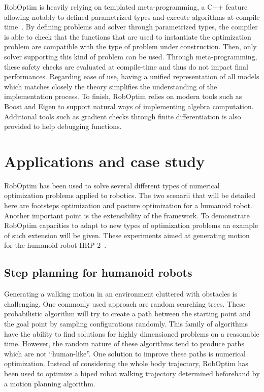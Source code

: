 \documentclass[conference,final,a4paper,twocolumn,9pt]{IEEEtran}
\begin{document}
RobOptim is heavily relying on templated meta-programming, a C++
feature allowing notably to defined parametrized types and execute
algorithms at compile time~\cite{iso14882}. By defining problems and
solver through parametrized types, the compiler is able to check that
the functions that are used to instantiate the optimization problem
are compatible with the type of problem under construction. Then, only
solver supporting this kind of problem can be used. Through
meta-programming, these safety checks are evaluated at compile-time
and thus do not impact final performances. Regarding ease of use,
having a unified representation of all models which matches closely
the theory simplifies the understanding of the implementation process.
To finish, RobOptim relies on modern tools such as Boost and Eigen to
support natural ways of implementing algebra computation. Additional
tools such as gradient checks through finite differentiation is also
provided to help debugging functions.


\section{Applications and case study}\label{sec:application}


RobOptim has been used to solve several different types of numerical
optimization problems applied to robotics. The two scenarii that will
be detailed here are footsteps optimization and posture optimization
for a humanoid robot. Another important point is the extensibility of
the framework. To demonstrate RobOptim capacities to adapt to new
types of optimization problems an example of such extension will be
given. These experiments aimed at generating motion for the humanoid
robot HRP-2~\cite{hrp2}.


\subsection{Step planning for humanoid robots}


Generating a walking motion in an environment cluttered with obstacles
is challenging. One commonly used approach are random searching
trees. These probabilistic algorithm will try to create a path between
the starting point and the goal point by sampling configurations
randomly. This family of algorithms have the ability to find solutions
for highly dimensioned problems on a reasonable time. However, the
random nature of these algorithms tend to produce paths which are not
``human-like''. One solution to improve these paths is numerical
optimization. Instead of considering the whole body trajectory,
RobOptim has been used to optimize a biped robot walking trajectory
determined beforehand by a motion planning algorithm.
\end{document}
